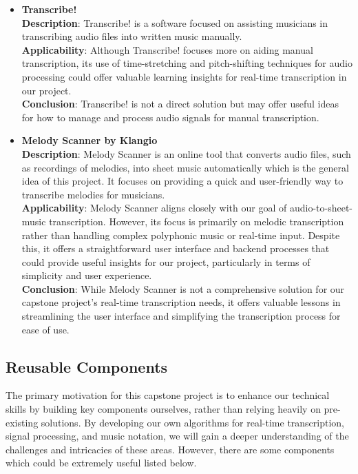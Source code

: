 \documentclass[12pt]{article}
\begin{document}
\begin{itemize}
    \item \textbf{Transcribe!}\cite{Transcribe!}\\
    \textbf{Description}: Transcribe! is a software focused on assisting musicians in transcribing audio files into written music manually.\\
    \textbf{Applicability}: Although Transcribe! focuses more on aiding manual transcription, its use of time-stretching and pitch-shifting techniques for audio processing could offer valuable learning insights for real-time transcription in our project.\\
    \textbf{Conclusion}: Transcribe! is not a direct solution but may offer useful ideas for how to manage and process audio signals for manual transcription.
    
    \item \textbf{Melody Scanner by Klangio}\cite{Melody-Scanner}\\
    \textbf{Description}: Melody Scanner is an online tool that converts audio files, such as recordings of melodies, into sheet music automatically which is the general idea of this project. It focuses on providing a quick and user-friendly way to transcribe melodies for musicians.\\
    \textbf{Applicability}: Melody Scanner aligns closely with our goal of audio-to-sheet-music transcription. However, its focus is primarily on melodic transcription rather than handling complex polyphonic music or real-time input. Despite this, it offers a straightforward user interface and backend processes that could provide useful insights for our project, particularly in terms of simplicity and user experience.\\
    \textbf{Conclusion}: While Melody Scanner is not a comprehensive solution for our capstone project’s real-time transcription needs, it offers valuable lessons in streamlining the user interface and simplifying the transcription process for ease of use.
\end{itemize}
\subsection{Reusable Components}
The primary motivation for this capstone project is to enhance our technical skills by building key components ourselves, rather than relying heavily on pre-existing solutions. By developing our own algorithms for real-time transcription, signal processing, and music notation, we will gain a deeper understanding of the challenges and intricacies of these areas. However, there are some components which could be extremely useful listed below.\\
\end{document}
